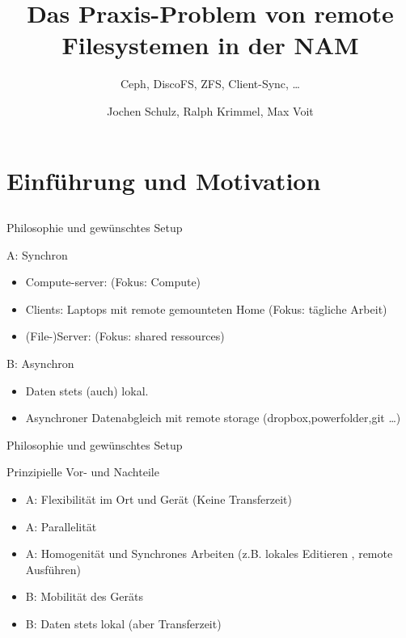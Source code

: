 \documentclass[hyperref={xetex}]{beamer}
\title{Das Praxis-Problem von remote Filesystemen in der NAM}
\subtitle{ Ceph, DiscoFS, ZFS, Client-Sync, \ldots}
\author{Jochen Schulz, Ralph Krimmel, Max Voit}
\begin{document}
	\nocite{*} 
	\begin{frame}
		\titlepage
	\end{frame}

	\begin{frame}
		\tableofcontents
	\end{frame}


\section{Einf\"uhrung und Motivation}
\subsection*{}

\begin{frame}{Philosophie und gewünschtes Setup}
    \begin{block}{A: Synchron}
    \begin{itemize}    
        \item Compute-server: (Fokus: Compute)
        \item Clients: Laptops mit remote gemounteten Home (Fokus: tägliche Arbeit)
        \item (File-)Server: (Fokus: shared ressources)
    \end{itemize}
\end{block}

\begin{block}{B: Asynchron}
    \begin{itemize}
                    \item  Daten stets (auch) lokal. 
                    \item Asynchroner Datenabgleich mit remote storage (dropbox,powerfolder,git \ldots )
                \end{itemize}

\end{block}
\end{frame}

\begin{frame}{Philosophie und gewünschtes Setup}

\begin{block}{Prinzipielle Vor- und Nachteile}
    \begin{itemize}
        \item A: Flexibilität im Ort und Gerät (Keine Transferzeit)
        \item A: Parallelität
        \item A: Homogenität und Synchrones Arbeiten (z.B. lokales Editieren , remote Ausführen)
        \item B: Mobilität des Geräts
        \item B: Daten stets lokal (aber Transferzeit)
    \end{itemize}
    
\end{block}
    

\end{frame}
\end{document}
